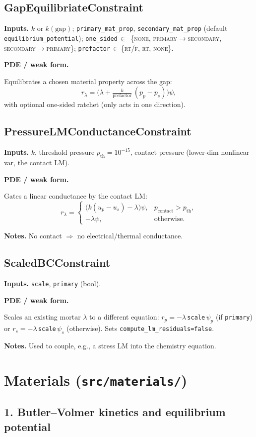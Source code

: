 \documentclass[11pt]{article}
\newenvironment{ecmEntry}[1]{%
  \subsection{#1}%
}{}
\newcommand{\inputsRow}[1]{\par\noindent\textbf{Inputs.} #1\par}
\newcommand{\pdeRow}[1]{\par\noindent\textbf{PDE / weak form.}\par #1\par}
\newcommand{\notesRow}[1]{\par\noindent\textbf{Notes.} #1\par}
\begin{document}
\begin{ecmEntry}{GapEquilibriateConstraint}
\inputsRow{$k$ or $k(\text{gap})$; \texttt{primary\_mat\_prop}, \texttt{secondary\_mat\_prop}
(default \texttt{equilibrium\_potential}); \texttt{one\_sided}\,$\in$\,
\{\textsc{none}, \textsc{primary$\to$secondary}, \textsc{secondary$\to$primary}\};
\texttt{prefactor}\,$\in$\,\{\textsc{rt/f}, \textsc{rt}, \textsc{none}\}.}
\pdeRow{Equilibrates a chosen material property across the gap:
\[
  r_\lambda = \bigl(\lambda + \tfrac{k}{\text{prefactor}}\,(p_p - p_s)\bigr)\psi,
\]
with optional one-sided ratchet (only acts in one direction).}
\end{ecmEntry}

\begin{ecmEntry}{PressureLMConductanceConstraint}
\inputsRow{$k$, threshold pressure $p_{\text{th}}=10^{-15}$, contact pressure (lower-dim
nonlinear var, the contact LM).}
\pdeRow{Gates a linear conductance by the contact LM:
\[
  r_\lambda = \begin{cases}\bigl(k(u_p-u_s)-\lambda\bigr)\psi, & p_{\text{contact}}>p_{\text{th}},\\
   -\lambda\psi, & \text{otherwise.}\end{cases}
\]}
\notesRow{No contact $\Rightarrow$ no electrical/thermal conductance.}
\end{ecmEntry}

\begin{ecmEntry}{ScaledBCConstraint}
\inputsRow{\texttt{scale}, \texttt{primary} (bool).}
\pdeRow{Scales an existing mortar $\lambda$ to a different equation:
$r_p = -\lambda\,$\texttt{scale}$\,\psi_p$ (if \texttt{primary}) or
$r_s = -\lambda\,$\texttt{scale}$\,\psi_s$ (otherwise). Sets
\texttt{compute\_lm\_residuals=false}.}
\notesRow{Used to couple, e.g., a stress LM into the chemistry equation.}
\end{ecmEntry}

\section{Materials (\texttt{src/materials/})}

\subsection*{1. Butler--Volmer kinetics and equilibrium potential}
\end{document}
